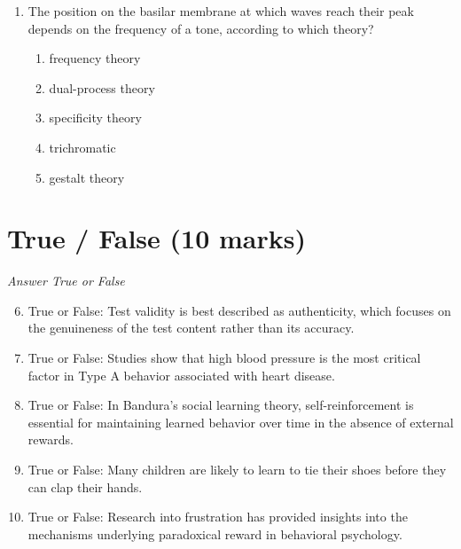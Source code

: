 \documentclass[12pt]{article}
\begin{document}
\begin{enumerate}[label=\arabic*.]
\begin{enumerate}[label=(\alph*)]
    \item performance review
    \item job analysis
    \item job description
    \item organizational analysis
    \item workforce analysis
\end{enumerate}
\item The position on the basilar membrane at which waves reach their peak depends on the frequency of a tone, according to which theory?
\begin{enumerate}[label=(\alph*)]
    \item frequency theory
    \item dual-process theory
    \item specificity theory
    \item trichromatic
    \item gestalt theory
\end{enumerate}
\end{enumerate}

\section*{True / False (10 marks)}
\textit{Answer True or False}
\begin{enumerate}[label=\arabic*.]
\setcounter{enumi}{5}
\item True or False: Test validity is best described as authenticity, which focuses on the genuineness of the test content rather than its accuracy.
\item True or False: Studies show that high blood pressure is the most critical factor in Type A behavior associated with heart disease.
\item True or False: In Bandura's social learning theory, self-reinforcement is essential for maintaining learned behavior over time in the absence of external rewards.
\item True or False: Many children are likely to learn to tie their shoes before they can clap their hands.
\item True or False: Research into frustration has provided insights into the mechanisms underlying paradoxical reward in behavioral psychology.
\end{enumerate}
\end{document}
